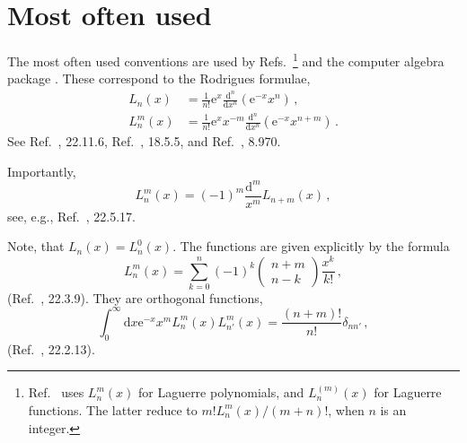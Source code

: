 \documentclass[a4paper,12pt,final]{article}
\def\d{\mathrm{d}}
\def\e{\mathrm{e}}
\begin{document}
\section{Most often used}\label{sec:AbrSteg}
The most often used conventions are used by Refs.\ \cite{AbrSteg, NIST, RG, AWH, Bronshtein, AAR, Askey, Erdelyi, Lebedev, MO, Olver, Prud, SL, Sz}\footnote{Ref.\ \cite{Erdelyi} uses $L_n^m(x)$ for Laguerre polynomials, and $L_n^{(m)}(x)$ for Laguerre functions. The latter reduce to $m! L_n^m(x)/(m+n)!$, when $n$ is an integer.} and the computer algebra package \cite{Wolfram}. These correspond to the Rodrigues formulae,
\begin{equation}\label{eq:Rodrigues}
\begin{aligned}
 L_n(x) &= \frac{1}{n!}\e^x \frac{\d^n}{\d x^n} (\e^{-x} x^n)\,,\\
 L_n^m(x) &= \frac{1}{n!} \e^x x^{-m} \frac{\d^n}{\d x^n}(\e^{-x} x^{n+m})\,.
\end{aligned} 
\end{equation}
See Ref.\ \cite{AbrSteg}, 22.11.6, Ref.\ \cite{NIST}, 18.5.5, and Ref.\ \cite{RG}, 8.970.

Importantly,
\begin{equation}\label{eq:Generalized}
 L_n^m(x) = (-1)^m \frac{\d^m}{x^m} L_{n+m}(x)\,,
\end{equation}
see, e.g., Ref.\ \cite{AbrSteg}, 22.5.17.

Note, that $L_n(x) = L_n^0(x)$. The functions are given explicitly by the formula
\begin{equation}\label{eq:explicit}
L_n^m(x) = \sum_{k=0}^n (-1)^k \begin{pmatrix} n+m \\ n-k \end{pmatrix} \frac{x^k}{k!}\,,
\end{equation}
(Ref.\ \cite{AbrSteg}, 22.3.9). They are orthogonal functions,
\begin{equation}\label{eq:orthogonal}
 \int_0^\infty \d x \e^{-x}x^m L_n^m(x) L_{n'}^m (x) = \frac{(n+m)!}{n!}\delta_{nn'}\,,
\end{equation}
(Ref.\ \cite{AbrSteg}, 22.2.13).
\end{document}
